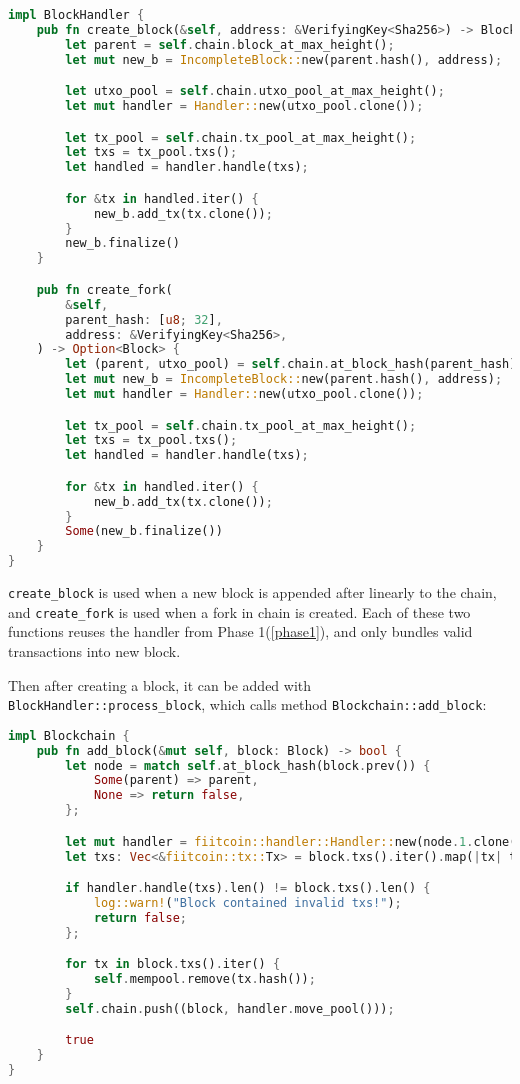 \begin{lstlisting}[language=Rust, style=boxed, caption={BlockHandler}]
impl BlockHandler {
    pub fn create_block(&self, address: &VerifyingKey<Sha256>) -> Block {
        let parent = self.chain.block_at_max_height();
        let mut new_b = IncompleteBlock::new(parent.hash(), address);

        let utxo_pool = self.chain.utxo_pool_at_max_height();
        let mut handler = Handler::new(utxo_pool.clone());

        let tx_pool = self.chain.tx_pool_at_max_height();
        let txs = tx_pool.txs();
        let handled = handler.handle(txs);

        for &tx in handled.iter() {
            new_b.add_tx(tx.clone());
        }
        new_b.finalize()
    }

    pub fn create_fork(
        &self,
        parent_hash: [u8; 32],
        address: &VerifyingKey<Sha256>,
    ) -> Option<Block> {
        let (parent, utxo_pool) = self.chain.at_block_hash(parent_hash)?;
        let mut new_b = IncompleteBlock::new(parent.hash(), address);
        let mut handler = Handler::new(utxo_pool.clone());

        let tx_pool = self.chain.tx_pool_at_max_height();
        let txs = tx_pool.txs();
        let handled = handler.handle(txs);

        for &tx in handled.iter() {
            new_b.add_tx(tx.clone());
        }
        Some(new_b.finalize())
    }
}
\end{lstlisting}

\texttt{create\_block} is used when a new block is appended after linearly
to the chain, and \texttt{create\_fork} is used when a fork in chain is created.
Each of these two functions reuses the handler from Phase 1(\ref{phase1}),
and only bundles valid transactions into new block.

Then after creating a block, it can be added with \texttt{BlockHandler::process\_block},
which calls method \texttt{Blockchain::add\_block}:

\begin{lstlisting}[language=Rust, style=boxed, caption={Blockchain::add\_block}]
impl Blockchain {
    pub fn add_block(&mut self, block: Block) -> bool {
        let node = match self.at_block_hash(block.prev()) {
            Some(parent) => parent,
            None => return false,
        };

        let mut handler = fiitcoin::handler::Handler::new(node.1.clone());
        let txs: Vec<&fiitcoin::tx::Tx> = block.txs().iter().map(|tx| tx).collect();

        if handler.handle(txs).len() != block.txs().len() {
            log::warn!("Block contained invalid txs!");
            return false;
        };

        for tx in block.txs().iter() {
            self.mempool.remove(tx.hash());
        }
        self.chain.push((block, handler.move_pool()));

        true
    }
}
\end{lstlisting}

